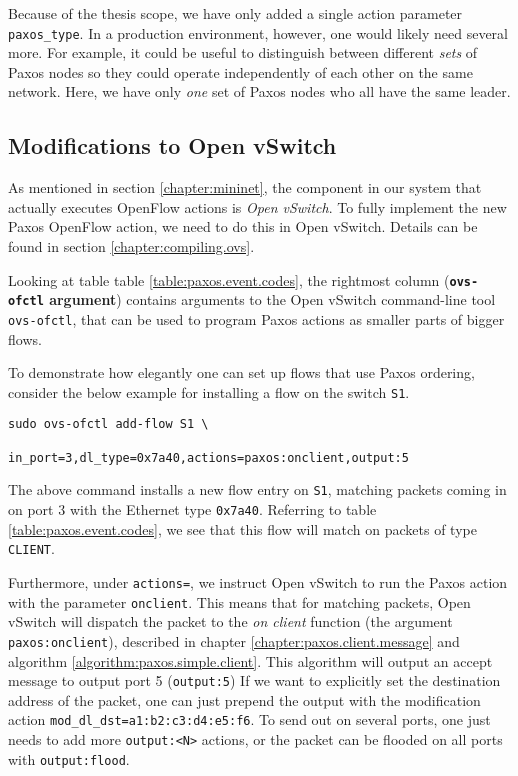 Because of the thesis scope, we have only added a single action parameter
\texttt{paxos\_type}.
%
In a production environment, however, one would likely need several more.
%
For example, it could be useful to distinguish between different
\textit{sets} of Paxos nodes so they could operate independently of each
other on the same network.
%
Here, we have only \textit{one} set of Paxos nodes who all have the same
leader.

\subsection{Modifications to Open vSwitch}

As mentioned in section \vref{chapter:mininet}, the component in our system
that actually executes OpenFlow actions is \textit{Open vSwitch}.
To fully implement the new Paxos OpenFlow action, we need to do this in Open
vSwitch.  Details can be found in section \vref{chapter:compiling.ovs}.

Looking at table table \vref{table:paxos.event.codes}, the rightmost column
(\textbf{\texttt{ovs-ofctl} argument}) contains arguments to the Open
vSwitch command-line tool \texttt{ovs-ofctl}, that can be used to program
Paxos actions as smaller parts of bigger flows.

To demonstrate how elegantly one can set up flows that use Paxos ordering,
consider the below example for installing a flow on the switch
\texttt{S1}.

\begin{Verbatim}
sudo ovs-ofctl add-flow S1 \
               in_port=3,dl_type=0x7a40,actions=paxos:onclient,output:5
\end{Verbatim}

The above command installs a new flow entry on \texttt{S1}, matching packets
coming in on port 3 with the Ethernet type \texttt{0x7a40}.  
Referring to table \vref{table:paxos.event.codes}, we see that this flow
will match on packets of type \texttt{CLIENT}.

Furthermore, under \texttt{actions=}, we instruct Open vSwitch to run the
Paxos action with the parameter \texttt{onclient}.  This means that for
matching packets, Open vSwitch will dispatch the packet to the \textit{on
client} function (the argument \texttt{paxos:onclient}), described in
chapter \vref{chapter:paxos.client.message} and algorithm
\vref{algorithm:paxos.simple.client}.
%
This algorithm will output an accept message to output port 5
(\texttt{output:5})
If we want to explicitly set the destination address of the packet, one can
just prepend the output with the modification action
\texttt{mod\_dl\_dst=a1:b2:c3:d4:e5:f6}.
To send out on several ports, one just needs to add more \texttt{output:<N>}
actions, or the packet can be flooded on all ports with
\texttt{output:flood}.

